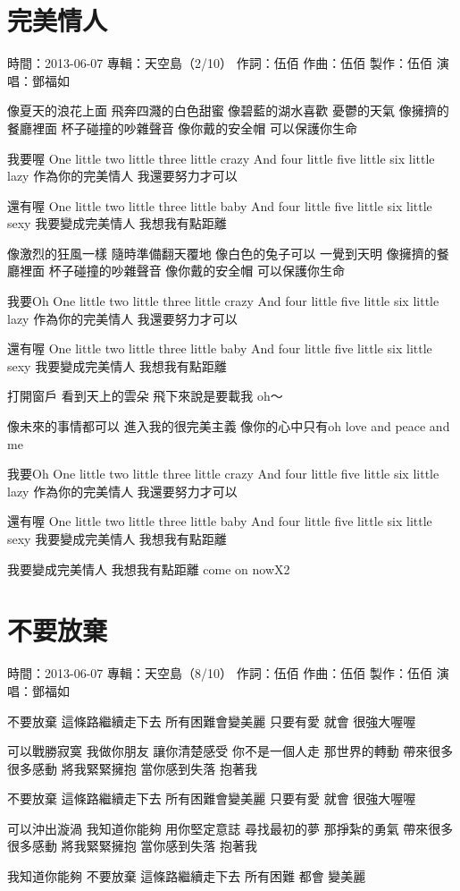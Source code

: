 \documentclass[UTF8,a4paper,oneside,twocolumn,12pt]{ctexbook}
\newcommand{\infopair}[2]{\textbullet #1：#2}
\newcommand{\zc}[1][伍佰]{\infopair{作詞}{#1}}
\newcommand{\zq}[1][伍佰]{\infopair{作曲}{#1}}
\newcommand{\zj}[1]{\infopair{專輯}{#1}}
\newcommand{\zz}[1]{\infopair{製作}{#1}}
\newcommand{\sj}[1]{\infopair{時間}{#1}}
\newenvironment{info}{\begin{flushleft}\kaishu
	}
	{\end{flushleft}\normalsize\yahei\par}
\newenvironment{lyric}{
	}
{}
\begin{document}
\section{完美情人}
\begin{info}
	\sj{2013-06-07}
	\zj{天空島（2/10）}
	\zc
	\zq
	\zz{伍佰}
	\infopair{演唱}{鄧福如}
\end{info}
\begin{lyric}
	像夏天的浪花上面 飛奔四濺的白色甜蜜
	像碧藍的湖水喜歡 憂鬱的天氣
	像擁擠的餐廳裡面 杯子碰撞的吵雜聲音
	像你戴的安全帽 可以保護你生命

	我要喔 One little two little three
	little crazy And four little five
	little six little lazy
	作為你的完美情人 我還要努力才可以

	還有喔 One little two little three
	little baby And four little five
	little six little sexy
	我要變成完美情人 我想我有點距離

	像激烈的狂風一樣 隨時準備翻天覆地
	像白色的兔子可以 一覺到天明
	像擁擠的餐廳裡面 杯子碰撞的吵雜聲音
	像你戴的安全帽 可以保護你生命

	我要Oh One little two little three
	little crazy And four little five
	little six little lazy
	作為你的完美情人 我還要努力才可以

	還有喔 One little two little three
	little baby And four little five
	little six little sexy
	我要變成完美情人 我想我有點距離

	打開窗戶 看到天上的雲朵
	飛下來說是要載我 oh～

	像未來的事情都可以 進入我的很完美主義
	像你的心中只有oh love and peace and me

	我要Oh One little two little three
	little crazy And four little five
	little six little lazy
	作為你的完美情人 我還要努力才可以

	還有喔 One little two little three
	little baby And four little five
	little six little sexy
	我要變成完美情人 我想我有點距離

	我要變成完美情人 我想我有點距離
	come on nowX2
\end{lyric}

\section{不要放棄}
\begin{info}
	\sj{2013-06-07}
	\zj{天空島（8/10）}
	\zc
	\zq
	\zz{伍佰}
	\infopair{演唱}{鄧福如}
\end{info}
\begin{lyric}
	不要放棄 這條路繼續走下去
	所有困難會變美麗
	只要有愛 就會 很強大喔喔

	可以戰勝寂寞 我做你朋友
	讓你清楚感受 你不是一個人走
	那世界的轉動 帶來很多很多感動
	將我緊緊擁抱 當你感到失落
	抱著我

	不要放棄 這條路繼續走下去
	所有困難會變美麗
	只要有愛 就會 很強大喔喔

	可以沖出漩渦 我知道你能夠
	用你堅定意誌 尋找最初的夢
	那掙紮的勇氣 帶來很多很多感動
	將我緊緊擁抱 當你感到失落
	抱著我

	我知道你能夠
	不要放棄 這條路繼續走下去
	所有困難 都會 變美麗
\end{lyric}
\end{document}
